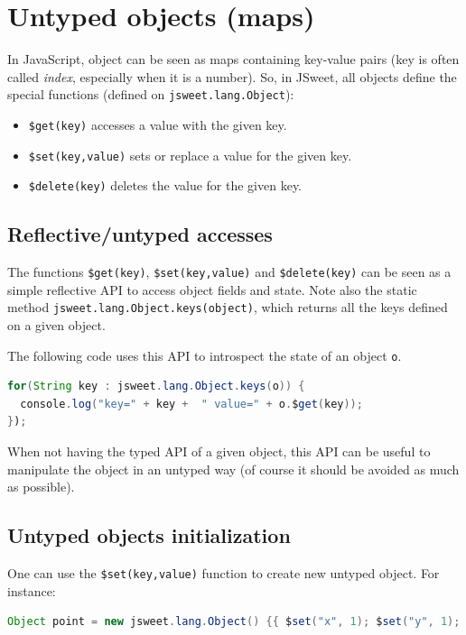 \documentclass[a4paper]{report}
\begin{document}
\section{Untyped objects (maps)}

In JavaScript, object can be seen as maps containing key-value pairs (key is often called \emph{index}, especially when it is a number). So, in JSweet, all objects define the special functions (defined on \texttt{jsweet.lang.Object}):

\begin{itemize}
\item \texttt{\$get(key)} accesses a value with the given key.
\item \texttt{\$set(key,value)} sets or replace a value for the given key.
\item \texttt{\$delete(key)} deletes the value for the given key.
\end{itemize}

\subsection{Reflective/untyped accesses}

The functions \texttt{\$get(key)}, \texttt{\$set(key,value)} and \texttt{\$delete(key)} can be seen as a simple reflective API to access object fields and state. Note also the static method \texttt{jsweet.lang.Object.keys(object)}, which returns all the keys defined on a given object. 

The following code uses this API to introspect the state of an object \texttt{o}.

\begin{lstlisting}[language=Java]
for(String key : jsweet.lang.Object.keys(o)) {
  console.log("key=" + key +  " value=" + o.$get(key));
});
\end{lstlisting}

When not having the typed API of a given object, this API can be useful to manipulate the object in an untyped way (of course it should be avoided as much as possible).

\subsection{Untyped objects initialization}

One can use the \texttt{\$set(key,value)} function to create new untyped object. For instance:

\begin{lstlisting}[language=Java]
Object point = new jsweet.lang.Object() {{ $set("x", 1); $set("y", 1); }};
\end{lstlisting}
\end{document}

